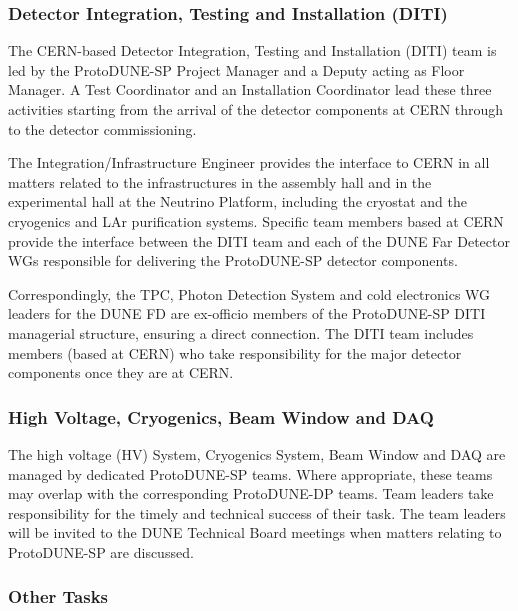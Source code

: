 \subsubsection{Detector Integration, Testing and Installation (DITI)}

The CERN-based Detector Integration, Testing and Installation (DITI) team is led by the ProtoDUNE-SP Project Manager and a Deputy acting as Floor Manager. A Test Coordinator and an Installation Coordinator lead these three activities starting from the arrival of the detector components at CERN through to the detector commissioning.

The Integration/Infrastructure Engineer provides the interface to CERN in all matters related to the infrastructures in the assembly hall and in the experimental hall at the Neutrino Platform, including the cryostat and the cryogenics and LAr purification systems.
Specific team members based at CERN provide the interface between the DITI team and each of the DUNE Far Detector WGs responsible for delivering the ProtoDUNE-SP detector components. 

Correspondingly, the TPC, Photon Detection System and cold electronics WG leaders for the DUNE FD are ex-officio members of the ProtoDUNE-SP DITI managerial structure, ensuring a direct connection. The DITI team includes members (based at CERN) who take responsibility for the major detector components once they are at CERN.

\subsubsection{High Voltage, Cryogenics, Beam Window and DAQ }

The high voltage (HV) System, Cryogenics System, Beam Window and DAQ are managed by dedicated ProtoDUNE-SP teams. Where appropriate, these teams may overlap with the corresponding ProtoDUNE-DP teams. Team leaders take responsibility for the timely and technical success of their task. The team leaders will be invited to the DUNE Technical Board meetings when matters relating to ProtoDUNE-SP are discussed.

\subsubsection{Other Tasks}

